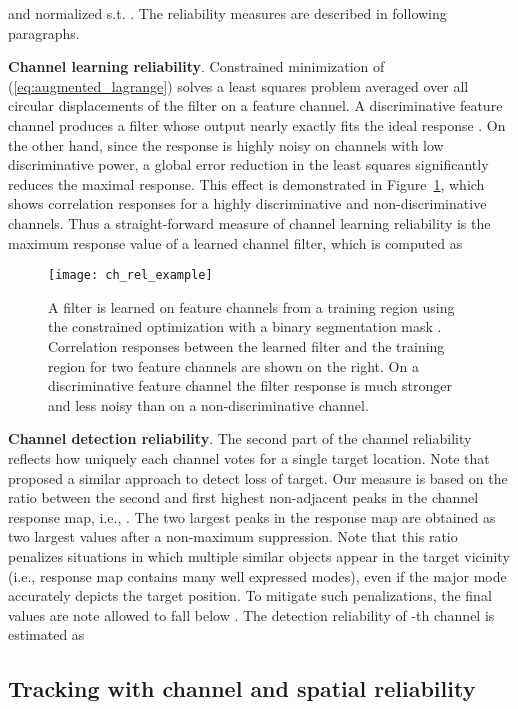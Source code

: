 \documentclass[twocolumn]{article}
\begin{document}
and normalized s.t. . The reliability measures are described in following paragraphs.

{\bf Channel learning reliability}.
Constrained minimization of (\ref{eq:augmented_lagrange}) solves a least squares problem averaged over all circular displacements of the filter on a feature channel. A discriminative feature channel  produces a filter  whose output  nearly exactly fits the ideal response . On the other hand, since the response is highly noisy on channels with low discriminative power, a global error reduction in the least squares significantly reduces the maximal response. This effect is demonstrated in Figure~\ref{fig:channel_rel}, which shows correlation responses for a highly discriminative and non-discriminative channels. Thus a straight-forward measure of channel learning reliability  is the maximum response value of a learned channel filter, which is computed as

\begin{figure}[!ht]
\centering
\texttt{[image: ch\_rel\_example]}
\caption{A filter is learned on feature channels from a training region using the constrained optimization with a binary segmentation mask . Correlation responses between the learned filter and the training region for two feature channels are shown on the right. On a discriminative feature channel the filter response is much stronger and less noisy than on a non-discriminative channel.}
\label{fig:channel_rel}
\end{figure}

{\bf Channel detection reliability}.
The second part of the channel reliability reflects how uniquely each channel votes for a single target location. Note that \cite{bolme2010visual} proposed a similar approach to detect loss of  target. Our measure is based on the ratio between the second and first highest non-adjacent peaks in the channel response map, i.e., . The two largest peaks in the response map are obtained as two largest values after a  non-maximum suppression. Note that this ratio penalizes situations in which multiple similar objects appear in the target vicinity (i.e., response map contains many well expressed modes), even if the major mode accurately depicts the target position. To mitigate such penalizations, the final values are note allowed to fall below . The detection reliability of -th channel is estimated as


\subsection{Tracking with channel and spatial reliability}  \label{sec:tracking_framework}
\end{document}
